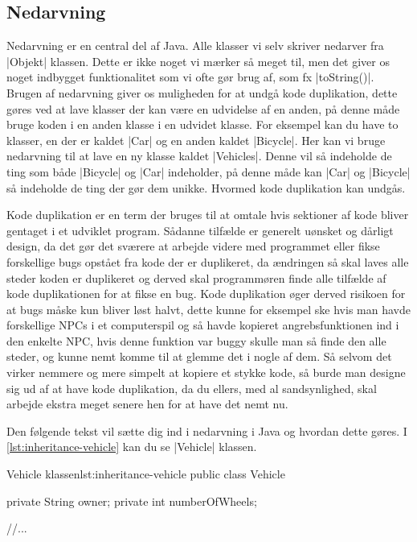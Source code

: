 \subsection{Nedarvning}

Nedarvning er en central del af Java. Alle klasser vi selv skriver
nedarver fra \JavaInline|Objekt| klassen. Dette er ikke noget vi
mærker så meget til, men det giver os noget indbygget funktionalitet
som vi ofte gør brug af, som fx \JavaInline|toString()|. Brugen af
nedarvning giver os muligheden for at undgå kode duplikation, dette
gøres ved at lave klasser der kan være en udvidelse af en anden, på
denne måde bruge koden i en anden klasse i en udvidet klasse. For
eksempel kan du have to klasser, en der er kaldet \JavaInline|Car| og
en anden kaldet \JavaInline|Bicycle|. Her kan vi bruge nedarvning til
at lave en ny klasse kaldet \JavaInline|Vehicles|. Denne vil så
indeholde de ting som både \JavaInline|Bicycle| og \JavaInline|Car|
indeholder, på denne måde kan \JavaInline|Car| og \JavaInline|Bicycle|
så indeholde de ting der gør dem unikke. Hvormed kode duplikation kan
undgås.

Kode duplikation er en term der bruges til at omtale hvis sektioner af
kode bliver gentaget i et udviklet program. Sådanne tilfælde er
generelt uønsket og dårligt design, da det gør det sværere at arbejde
videre med programmet eller fikse forskellige bugs opstået fra kode
der er duplikeret, da ændringen så skal laves alle steder koden er
duplikeret og derved skal programmøren finde alle tilfælde af kode
duplikationen for at fikse en bug. Kode duplikation øger derved
risikoen for at bugs måske kun bliver løst halvt, dette kunne for
eksempel ske hvis man havde forskellige NPCs i et computerspil og så
havde kopieret angrebsfunktionen ind i den enkelte NPC, hvis denne
funktion var buggy skulle man så finde den alle steder, og kunne nemt
komme til at glemme det i nogle af dem. Så selvom det virker nemmere
og mere simpelt at kopiere et stykke kode, så burde man designe sig ud
af at have kode duplikation, da du ellers, med al sandsynlighed, skal
arbejde ekstra meget senere hen for at have det nemt nu.

Den følgende tekst vil sætte dig ind i nedarvning i Java og hvordan
dette gøres. I \autoref{lst:inheritance-vehicle} kan du se
\JavaInline|Vehicle| klassen.

\begin{JavaCode}{Vehicle klassen}{lst:inheritance-vehicle}
	public class Vehicle {

		private String owner;
		private int numberOfWheels;

		//...
	}
\end{JavaCode}

